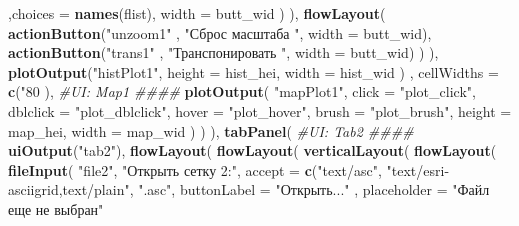 \documentclass[]{article}
\newenvironment{Shaded}{\begin{snugshade}}{\end{snugshade}}
\newcommand{\KeywordTok}[1]{\textcolor[rgb]{0.13,0.29,0.53}{\textbf{#1}}}
\newcommand{\DataTypeTok}[1]{\textcolor[rgb]{0.13,0.29,0.53}{#1}}
\newcommand{\StringTok}[1]{\textcolor[rgb]{0.31,0.60,0.02}{#1}}
\newcommand{\CommentTok}[1]{\textcolor[rgb]{0.56,0.35,0.01}{\textit{#1}}}
\newcommand{\NormalTok}[1]{#1}
\begin{document}
\begin{Shaded}
\begin{Highlighting}[]
\NormalTok{                          ,}\DataTypeTok{choices =} \KeywordTok{names}\NormalTok{(flist), }\DataTypeTok{width =}\NormalTok{ butt_wid}
\NormalTok{                          )}
\NormalTok{              ),}
              \KeywordTok{flowLayout}\NormalTok{(}
                \KeywordTok{actionButton}\NormalTok{(}\StringTok{"unzoom1"}\NormalTok{   , }\StringTok{"Сброс масштаба  "}\NormalTok{, }\DataTypeTok{width =}\NormalTok{ butt_wid),}
                \KeywordTok{actionButton}\NormalTok{(}\StringTok{"trans1"}\NormalTok{    , }\StringTok{"Транспонировать "}\NormalTok{, }\DataTypeTok{width =}\NormalTok{ butt_wid)}
\NormalTok{              )}
\NormalTok{            ),}
            \KeywordTok{plotOutput}\NormalTok{(}\StringTok{"histPlot1"}\NormalTok{,  }
                       \DataTypeTok{height =}\NormalTok{ hist_hei,}
                       \DataTypeTok{width =}\NormalTok{ hist_wid}
\NormalTok{            )}
\NormalTok{            , }\DataTypeTok{cellWidths =} \KeywordTok{c}\NormalTok{(}\StringTok{"80%"}\NormalTok{,}\StringTok{"20%"}\NormalTok{)}
\NormalTok{          ),}
          \CommentTok{#UI: Map1 ####}
          \KeywordTok{plotOutput}\NormalTok{(}
            \StringTok{"mapPlot1"}\NormalTok{,}
            \DataTypeTok{click =} \StringTok{"plot_click"}\NormalTok{,}
            \DataTypeTok{dblclick =} \StringTok{"plot_dblclick"}\NormalTok{,}
            \DataTypeTok{hover =} \StringTok{"plot_hover"}\NormalTok{,}
            \DataTypeTok{brush =} \StringTok{"plot_brush"}\NormalTok{,}
            \DataTypeTok{height =}\NormalTok{ map_hei,}
            \DataTypeTok{width =}\NormalTok{ map_wid}
\NormalTok{          )}
\NormalTok{          )}
\NormalTok{        ),}
        \KeywordTok{tabPanel}\NormalTok{(}
          \CommentTok{#UI: Tab2 ####}
          \KeywordTok{uiOutput}\NormalTok{(}\StringTok{"tab2"}\NormalTok{),}
          \KeywordTok{flowLayout}\NormalTok{(}
            \KeywordTok{flowLayout}\NormalTok{(}
            \KeywordTok{verticalLayout}\NormalTok{(}
              \KeywordTok{flowLayout}\NormalTok{(}
                \KeywordTok{fileInput}\NormalTok{(}
                  \StringTok{"file2"}\NormalTok{,}
                  \StringTok{"Открыть сетку 2:"}\NormalTok{,}
                  \DataTypeTok{accept =} \KeywordTok{c}\NormalTok{(}\StringTok{"text/asc"}\NormalTok{,}
                             \StringTok{"text/esri-asciigrid,text/plain"}\NormalTok{,}
                             \StringTok{".asc"}\NormalTok{,}
                             \DataTypeTok{buttonLabel =} \StringTok{"Открыть..."}
\NormalTok{                             , }\DataTypeTok{placeholder =} \StringTok{"Файл еще не выбран"}
}
\end{Highlighting}
\end{Shaded}
\end{document}
